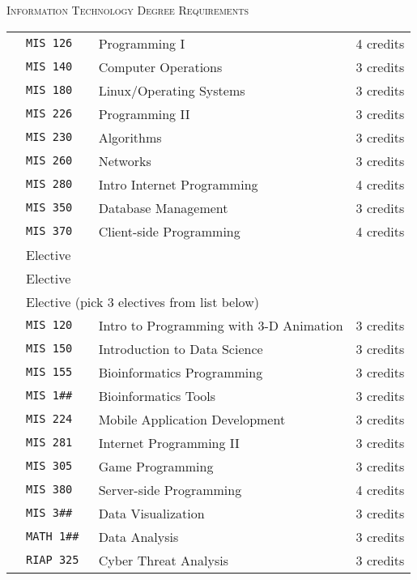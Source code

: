 \documentclass[letterpaper,10pt]{article}
\newcounter{cseNum}
\newcommand\csenumber{\stepcounter{cseNum}\arabic{cseNum}}
\begin{document}
\newpage

\vspace{20pt}
{\scshape \Large Information Technology Degree Requirements}\\


\begin{tabular}{l l l l }
  \csenumber & \texttt{MIS 126} & Programming I & 4 credits \\[2pt]
  \csenumber & \texttt{MIS 140} & Computer Operations  & 3 credits \\[2pt]
  \csenumber & \texttt{MIS 180} & Linux/Operating Systems  & 3 credits \\[2pt]
  \csenumber & \texttt{MIS 226} & Programming II  & 3 credits \\[2pt]
  \csenumber & \texttt{MIS 230} & Algorithms & 3 credits \\[2pt]
  \csenumber & \texttt{MIS 260} & Networks & 3 credits \\[2pt]
  \csenumber & \texttt{MIS 280} & Intro Internet Programming  & 4 credits \\[2pt]
  \csenumber & \texttt{MIS 350} & Database Management & 3 credits \\[2pt]
  \csenumber & \texttt{MIS 370} & Client-side Programming & 4 credits \\[2pt]
  \csenumber & \multicolumn{2}{l}{ Elective } &  \\[2pt]
  \csenumber &  \multicolumn{2}{l}{ Elective } &  \\[2pt]
  \csenumber & \multicolumn{3}{l}{Elective \hspace{2em} (pick 3 electives from list below)}\\[2pt]  
     & \texttt{MIS 120} & Intro to Programming with 3-D Animation &  3 credits \\[2pt]
     & \texttt{MIS 150} & Introduction to Data Science &  3 credits \\[2pt]
     & \texttt{MIS 155} & Bioinformatics Programming &  3 credits \\[2pt]
     & \texttt{MIS 1\#\#} & Bioinformatics Tools  &  3 credits \\[2pt]
     & \texttt{MIS 224} & Mobile Application Development &  3 credits \\[2pt]
     & \texttt{MIS 281} & Internet Programming II &  3 credits \\[2pt]
     & \texttt{MIS 305} & Game Programming &  3 credits \\[2pt]
     & \texttt{MIS 380} & Server-side Programming &  4 credits \\[2pt]
     & \texttt{MIS 3\#\#} & Data Visualization &  3 credits \\[2pt]
     & \texttt{MATH 1\#\#} & Data Analysis &  3 credits \\[2pt]
     & \texttt{RIAP 325 } & Cyber Threat Analysis &  3 credits \\
\end{tabular}
\end{document}
